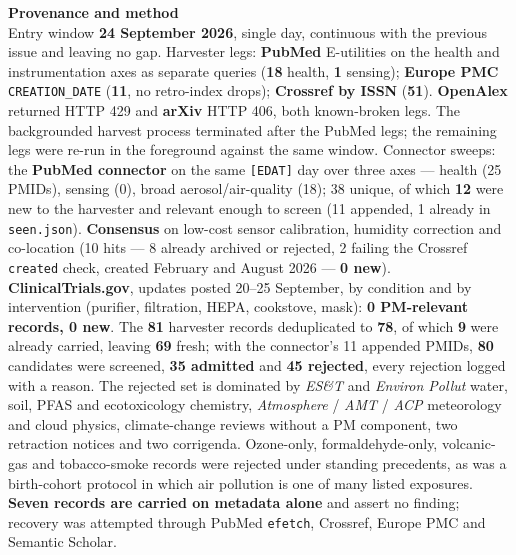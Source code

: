 \documentclass[10pt]{article}
\begin{document}


\vspace{2mm}

\begin{keybox}
{\sffamily\bfseries\footnotesize\color{Deep}Provenance and method}\\[1.2mm]
{\fontsize{7.2}{8.8}\selectfont
Entry window \textbf{24 September 2026}, single day, continuous with the previous issue and
leaving no gap. Harvester legs: \textbf{PubMed} E-utilities on the health and instrumentation
axes as separate queries (\textbf{18} health, \textbf{1} sensing); \textbf{Europe PMC}
\texttt{CREATION\_DATE} (\textbf{11}, no retro-index drops); \textbf{Crossref by ISSN}
(\textbf{51}). \textbf{OpenAlex} returned HTTP 429 and \textbf{arXiv} HTTP 406, both known-broken
legs. The backgrounded harvest process terminated after the PubMed legs; the remaining legs were
re-run in the foreground against the same window. Connector sweeps: the \textbf{PubMed connector}
on the same \texttt{[EDAT]} day over three axes --- health (25 PMIDs), sensing (0), broad
aerosol/air-quality (18); 38 unique, of which \textbf{12} were new to the harvester and relevant
enough to screen (11 appended, 1 already in \texttt{seen.json}). \textbf{Consensus} on low-cost
sensor calibration, humidity correction and co-location (10 hits --- 8 already archived or
rejected, 2 failing the Crossref \texttt{created} check, created February and August 2026 ---
\textbf{0 new}). \textbf{ClinicalTrials.gov}, updates posted 20--25 September, by condition and by
intervention (purifier, filtration, HEPA, cookstove, mask): \textbf{0 PM-relevant records,
0 new}.
The \textbf{81} harvester records deduplicated to \textbf{78}, of which \textbf{9} were already
carried, leaving \textbf{69} fresh; with the connector's 11 appended PMIDs, \textbf{80}
candidates were screened, \textbf{35 admitted} and \textbf{45 rejected}, every rejection logged
with a reason. The rejected set is dominated by \textit{ES\&T} and \textit{Environ Pollut}
water, soil, PFAS and ecotoxicology chemistry, \textit{Atmosphere} / \textit{AMT} / \textit{ACP}
meteorology and cloud physics, climate-change reviews without a PM component, two retraction
notices and two corrigenda. Ozone-only, formaldehyde-only, volcanic-gas and tobacco-smoke
records were rejected under standing precedents, as was a birth-cohort protocol in which air
pollution is one of many listed exposures.
\textbf{Seven records are carried on metadata alone} and assert no finding; recovery was
attempted through PubMed \texttt{efetch}, Crossref, Europe PMC and Semantic Scholar.
}
\end{keybox}
\end{document}
